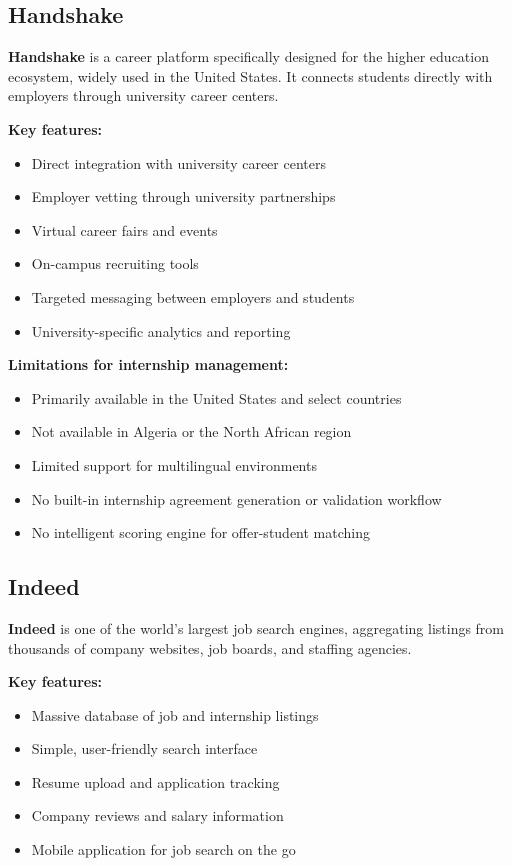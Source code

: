 \subsection{Handshake}

\textbf{Handshake} is a career platform specifically designed for the higher education ecosystem, widely used in the United States. It connects students directly with employers through university career centers.

\textbf{Key features:}
\begin{itemize}
    \item Direct integration with university career centers
    \item Employer vetting through university partnerships
    \item Virtual career fairs and events
    \item On-campus recruiting tools
    \item Targeted messaging between employers and students
    \item University-specific analytics and reporting
\end{itemize}

\textbf{Limitations for internship management:}
\begin{itemize}
    \item Primarily available in the United States and select countries
    \item Not available in Algeria or the North African region
    \item Limited support for multilingual environments
    \item No built-in internship agreement generation or validation workflow
    \item No intelligent scoring engine for offer-student matching
\end{itemize}

\subsection{Indeed}

\textbf{Indeed} is one of the world's largest job search engines, aggregating listings from thousands of company websites, job boards, and staffing agencies.

\textbf{Key features:}
\begin{itemize}
    \item Massive database of job and internship listings
    \item Simple, user-friendly search interface
    \item Resume upload and application tracking
    \item Company reviews and salary information
    \item Mobile application for job search on the go
\end{itemize}

